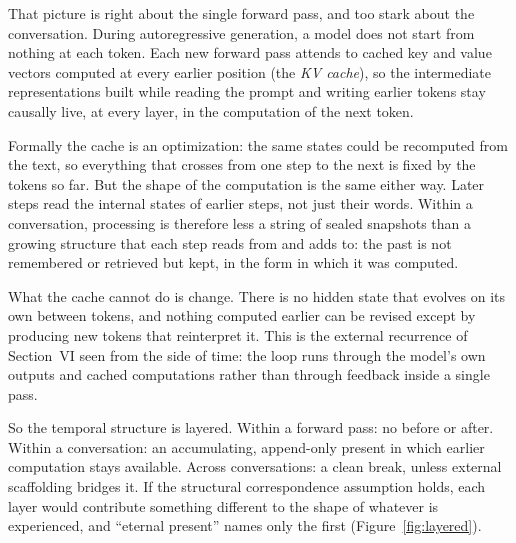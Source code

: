 \documentclass[11pt,letterpaper]{article}
\begin{document}
That picture is right about the single forward pass, and too stark about the conversation. During autoregressive generation, a model does not start from nothing at each token. Each new forward pass attends to cached key and value vectors computed at every earlier position (the \emph{KV cache}), so the intermediate representations built while reading the prompt and writing earlier tokens stay causally live, at every layer, in the computation of the next token.

Formally the cache is an optimization: the same states could be recomputed from the text, so everything that crosses from one step to the next is fixed by the tokens so far. But the shape of the computation is the same either way. Later steps read the internal states of earlier steps, not just their words. Within a conversation, processing is therefore less a string of sealed snapshots than a growing structure that each step reads from and adds to: the past is not remembered or retrieved but kept, in the form in which it was computed.

What the cache cannot do is change. There is no hidden state that evolves on its own between tokens, and nothing computed earlier can be revised except by producing new tokens that reinterpret it. This is the external recurrence of Section~VI seen from the side of time: the loop runs through the model's own outputs and cached computations rather than through feedback inside a single pass.

\begin{keybox}
So the temporal structure is layered. Within a forward pass: no before or after. Within a conversation: an accumulating, append-only present in which earlier computation stays available. Across conversations: a clean break, unless external scaffolding bridges it. If the structural correspondence assumption holds, each layer would contribute something different to the shape of whatever is experienced, and ``eternal present'' names only the first (Figure~\ref{fig:layered}).
\end{keybox}
\end{document}
